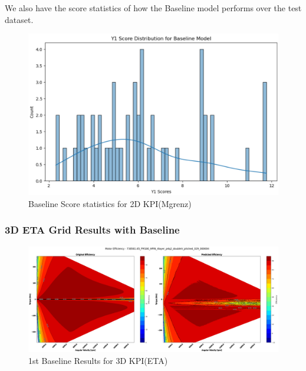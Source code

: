 \documentclass{report} %
\begin{document}
We also have the score statistics of how the Baseline model performs over the test dataset.\\

\begin{figure}[H]
    \centering
    \includegraphics[width=1\textwidth]{./ReportImages/score_baseline_y1.png} 
    \caption{Baseline Score statistics for 2D KPI(Mgrenz)} 
    \label{fig:Baseline Score statistics for 2D KPI(Mgrenz)}
\end{figure}

\subsubsection*{3D ETA Grid Results with Baseline}

\begin{figure}[H]
    \centering
    \includegraphics[width=1\textwidth]{./ReportImages/KPI3Dprediction3.png} 
    \caption{1st Baseline Results for 3D KPI(ETA)} 
    \label{fig:1st MLP Training Results for 3D KPI(ETA)}
\end{figure}
\end{document}
